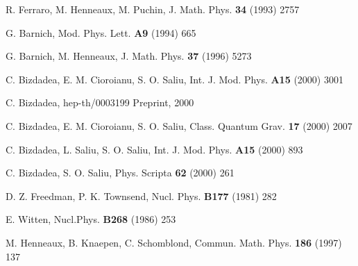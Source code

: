 \documentclass[a4paper,12pt]{article}
\begin{document}
\begin{thebibliography}{99}
  R. Ferraro, M. Henneaux, M. Puchin, J. Math. Phys. \textbf{34}
(1993) 2757

  G. Barnich, Mod. Phys. Lett. \textbf{A9} (1994) 665

  G. Barnich, M. Henneaux, J. Math. Phys. \textbf{37} (1996) 5273

  C. Bizdadea, E. M. Cioroianu, S. O. Saliu, Int. J. Mod. Phys. 
\textbf{A15} (2000) 3001

  C. Bizdadea, hep-th/0003199 Preprint, 2000

  C. Bizdadea, E. M. Cioroianu, S. O. Saliu, Class. Quantum
Grav. \textbf{17} (2000) 2007

  C. Bizdadea, L. Saliu, S. O. Saliu, Int. J. Mod. Phys. \textbf{%
A15} (2000) 893

  C. Bizdadea, S. O. Saliu, Phys. Scripta \textbf{62} (2000) 261

  D. Z. Freedman, P. K. Townsend, Nucl. Phys. \textbf{B177}
(1981) 282

  E. Witten, Nucl.Phys. \textbf{B268} (1986) 253

  M. Henneaux, B. Knaepen, C. Schomblond, Commun. Math. Phys. 
\textbf{186} (1997) 137
\end{thebibliography}
\end{document}
